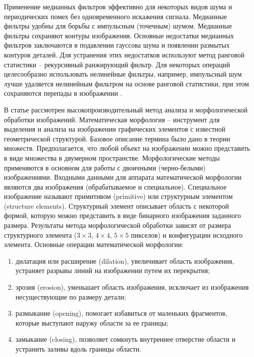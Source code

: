 Применение медианных фильтров эффективно для некоторых видов шума и периодических помех без одновременного искажения сигнала. Медианные фильтры удобны для борьбы с импульсным (точечным) шумом. Медианные фильтры сохраняют контуры изображения. Основные недостатки медианных фильтров заключаются в подавлении гауссова шума и появлении размытых контуров деталей. Для устранения этих
недостатков используют метод ранговой статистики – рекурсивный ранжирующий фильтр. Для некоторых операций целесообразно использовать нелинейные фильтры, например, импульсный шум лучше удаляется нелинейным фильтром на основе ранговой статистики, при этом сохраняются перепады в изображении \cite{gruzman2002digital}.

В статье \cite{7025588}рассмотрен высокопроизводительный метод анализа и морфологической обработки изображений. 
Математическая морфология – инструмент для выделения и анализа на изображении графических элементов с известной геометрической структурой. Базовое описание термина было дано в теории множеств. Предполагается, что любой объект на изображении можно представить в виде множества в двумерном пространстве. Морфологические методы применяются в основном для работы с двоичными (черно-белыми) изображениями. Входными данными для аппарата математической морфологии являются два изображения (обрабатываемое и специальное). Специальное изображение называют примитивом (primitive) или структурным элементом (structure elements). Структурный элемент описывает область с некоторой формой, которую можно представить в виде бинарного изображения заданного размера. Результаты метода морфологической обработки зависят от размера структурного элемента ($3\times3$, $4\times4$, $5\times5$ пикселов) и конфигурации исходного элемента. Основные операции математической морфологии:

\begin{enumerate}
\item дилатация или расширение (dilation), увеличивает область изображения, устраняет разрывы линий на изображении путем их перекрытия;

\item эрозия (erosion), уменьшает область изображения, исключает из изображения несуществующие по размеру детали;

\item размыкание (opening), помогает избавиться от маленьких фрагментов, которые выступают наружу области за ее границы;

\item замыкание (closing), позволяет сомкнуть внутреннее отверстие области и устранить заливы вдоль границы области.
\end{enumerate}

